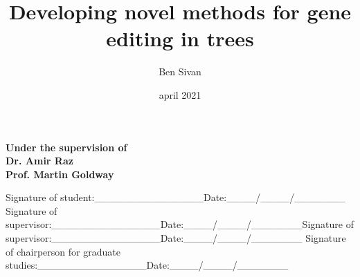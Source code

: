 \documentclass[
]{article}
\title{Developing novel methods for gene editing in trees}
\author{Ben Sivan}
\date{april 2021}
\begin{document}
\maketitle


\begin{center}
   \textbf{\large Under the supervision of\\
                      Dr. Amir Raz\\
                  Prof. Martin Goldway}
\end{center}

\vspace{\fill}

Signature of
student:\_\_\_\_\_\_\_\_\_\_\_\_\_\_\_Date:\_\_\_\_/\_\_\_\_/\_\_\_\_\_\_\_
\hfill \break \newline Signature of
supervisor:\_\_\_\_\_\_\_\_\_\_\_\_\_\_\_Date:\_\_\_\_/\_\_\_\_/\_\_\_\_\_\_\_\hfill \break \newline Signature
of
supervisor:\_\_\_\_\_\_\_\_\_\_\_\_\_\_\_Date:\_\_\_\_/\_\_\_\_/\_\_\_\_\_\_\_
\hfill \break \newline Signature of chairperson for graduate
studies:\_\_\_\_\_\_\_\_\_\_\_\_\_\_\_Date:\_\_\_\_/\_\_\_\_/\_\_\_\_\_\_\_
\end{document}
